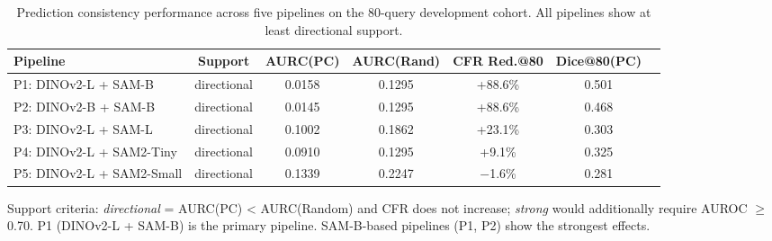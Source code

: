 \begin{table}[t]
\centering
\caption{Prediction consistency performance across five pipelines on the 80-query 
development cohort. All pipelines show at least directional support.}
\label{tab:cross_pipeline}
\begin{tabular}{lcccccc}
\toprule
\textbf{Pipeline} & \textbf{Support} & \textbf{AURC(PC)} & \textbf{AURC(Rand)} & \textbf{CFR Red.@80} & \textbf{Dice@80(PC)} \\
\midrule
P1: DINOv2-L + SAM-B & directional & 0.0158 & 0.1295 & +88.6\% & 0.501 \\
P2: DINOv2-B + SAM-B & directional & 0.0145 & 0.1295 & +88.6\% & 0.468 \\
P3: DINOv2-L + SAM-L & directional & 0.1002 & 0.1862 & +23.1\% & 0.303 \\
P4: DINOv2-L + SAM2-Tiny & directional & 0.0910 & 0.1295 & +9.1\% & 0.325 \\
P5: DINOv2-L + SAM2-Small & directional & 0.1339 & 0.2247 & $-$1.6\% & 0.281 \\
\bottomrule
\end{tabular}
\vspace{4pt}
\par\small Support criteria: \textit{directional} = AURC(PC) < AURC(Random) and CFR does not increase; 
\textit{strong} would additionally require AUROC $\ge$ 0.70. 
P1 (DINOv2-L + SAM-B) is the primary pipeline. SAM-B-based pipelines (P1, P2) show the strongest effects.
\end{table}

